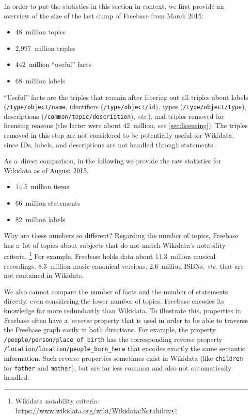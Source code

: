 \documentclass{sig-alternate-2013}
\begin{document}
In order to put the statistics in this section in context,
we first provide an overview of the size of the last dump of Freebase
from March 2015:

\begin{itemize}
  \setlength\itemsep{0em}
  \item 48~million topics
  \item 2,997~million triples
  \item 442~million ``useful'' facts%
  \item 68~million labels
\end{itemize}

``Useful'' facts are the triples that remain
after filtering out all triples about labels
(\texttt{/type/object/name}, identifiers (\texttt{/type/object/id}),
types (\texttt{/type/object/type}), descript\-ions
(\texttt{/common/topic/description}), \emph{etc.}), and triples removed
for licensing reasons (the latter were about 42~million, see \autoref{sec:licensing}).
The triples removed in this step are not considered to be potentially useful for
Wikidata, since IDs, labels, and descriptions are not handled through statements.

As a~direct comparison, in the following we provide the raw statistics for Wikidata as of August 2015.

\begin{itemize}
    \setlength\itemsep{0em}
    \item 14.5~million items
    \item 66~million statements
    \item 82~million labels
\end{itemize}

Why are these numbers so different?
Regarding the number of topics, Freebase has a~lot of topics about subjects
that do not match Wikidata's notability criteria.%
\footnote{Wikidata notability criteria:
\url{https://www.wikidata.org/wiki/Wikidata:Notability}}
For example, Freebase holds data about 11.3~million musical recordings,
8.3~million music canonical versions, 2.6~million ISBNs, \emph{etc.} that are not contained in Wikidata.

We also cannot compare the number of facts and the number of statements directly,
even considering the lower number of topics.
Freebase encodes its knowledge far more redundantly than Wikidata.
To illustrate this, properties in Freebase often have a~\emph{reverse} property
that is used in order to be able to traverse the Freebase graph easily in both directions.
For example, the property \texttt{/people/person/place\-\_of\_birth} has the corresponding
reverse property \linebreak \texttt{/location/location/people\_born\_here}
that encodes exactly the same semantic information.
Such reverse properties sometimes exist in Wikidata
(like \texttt{children} for \texttt{father} and \texttt{mother}),
but are far less common and also not automatically handled.
\end{document}
